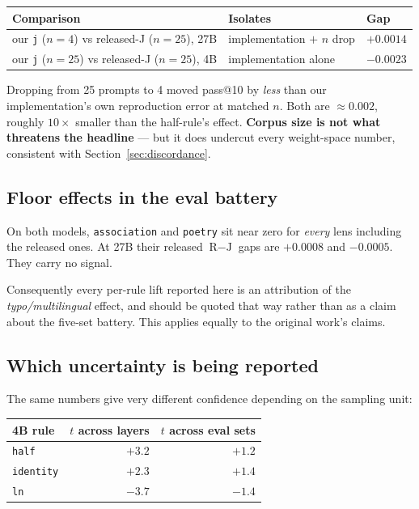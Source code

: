 \documentclass[11pt,a4paper]{article}
\newcommand{\cfg}[1]{\texttt{#1}}
\begin{document}
\begin{center}
\begin{tabular}{@{}lll@{}}
\toprule
\textbf{Comparison} & \textbf{Isolates} & \textbf{Gap} \\
\midrule
our \cfg{j} ($n{=}4$) vs released-J ($n{=}25$), 27B & implementation $+$ $n$ drop & $+0.0014$ \\
our \cfg{j} ($n{=}25$) vs released-J ($n{=}25$), 4B & implementation alone & $-0.0023$ \\
\bottomrule
\end{tabular}
\end{center}

\noindent
Dropping from 25 prompts to 4 moved pass@10 by \emph{less} than our implementation's
own reproduction error at matched $n$. Both are $\approx 0.002$, roughly $10\times$
smaller than the half-rule's effect. \textbf{Corpus size is not what threatens the
headline} --- but it does undercut every weight-space number, consistent with
Section~\ref{sec:discordance}.

\subsection{Floor effects in the eval battery}
\label{sec:floor}

On both models, \texttt{association} and \texttt{poetry} sit near zero for
\emph{every} lens including the released ones. At 27B their released
$\text{R}-\text{J}$ gaps are $+0.0008$ and $-0.0005$. They carry no signal.

Consequently every per-rule lift reported here is an attribution of the
\emph{typo/multilingual} effect, and should be quoted that way rather than as a claim
about the five-set battery. This applies equally to the original work's claims.

\subsection{Which uncertainty is being reported}

The same numbers give very different confidence depending on the sampling unit:

\begin{center}
\begin{tabular}{@{}lrr@{}}
\toprule
\textbf{4B rule} & \textbf{$t$ across layers} & \textbf{$t$ across eval sets} \\
\midrule
\cfg{half}     & $+3.2$ & $+1.2$ \\
\cfg{identity} & $+2.3$ & $+1.4$ \\
\cfg{ln}       & $-3.7$ & $-1.4$ \\
\bottomrule
\end{tabular}
\end{center}
\end{document}
